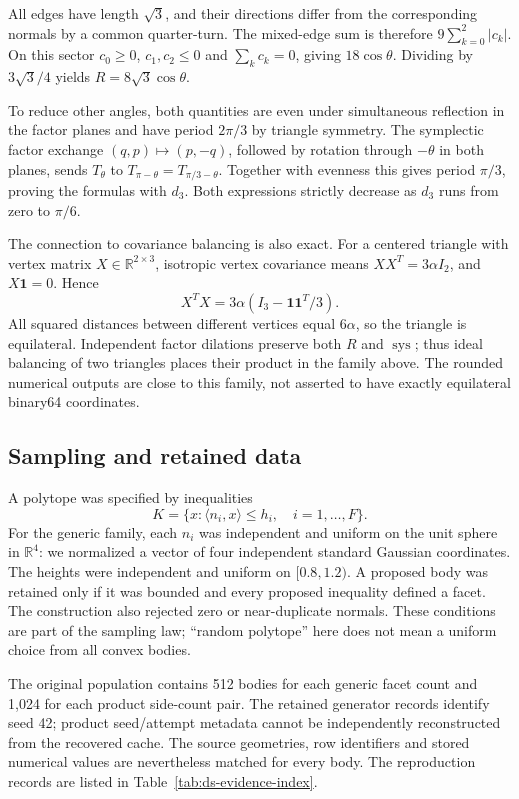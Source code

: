 All edges have length $\sqrt3$, and their directions differ from the
corresponding normals by a common quarter-turn. The mixed-edge sum is
therefore $9\sum_{k=0}^2|c_k|$. On this sector $c_0\geq0$,
$c_1,c_2\leq0$ and $\sum_k c_k=0$, giving $18\cos\theta$.
Dividing by $3\sqrt3/4$ yields $R=8\sqrt3\cos\theta$.

To reduce other angles, both quantities are even under simultaneous
reflection in the factor planes and have period $2\pi/3$ by triangle
symmetry. The symplectic factor exchange $(q,p)\mapsto(p,-q)$, followed
by rotation through $-\theta$ in both planes, sends $T_\theta$ to
$T_{\pi-\theta}=T_{\pi/3-\theta}$. Together with evenness this gives
period $\pi/3$, proving the formulas with $d_3$. Both expressions
strictly decrease as $d_3$ runs from zero to $\pi/6$.

The connection to covariance balancing is also exact. For a centered
triangle with vertex matrix $X\in\mathbb R^{2\times3}$, isotropic vertex
covariance means $XX^T=3\alpha I_2$, and $X\mathbf1=0$. Hence
\[
 X^TX=3\alpha(I_3-\mathbf1\mathbf1^T/3).
\]
All squared distances between different vertices equal $6\alpha$, so
the triangle is equilateral. Independent factor dilations preserve both
$R$ and $\operatorname{sys}$; thus ideal balancing of two triangles
places their product in the family above. The rounded numerical outputs
are close to this family, not asserted to have exactly equilateral
binary64 coordinates.

\subsection{Sampling and retained data}\label{app:ds-generation}

A polytope was specified by inequalities
\[
 K=\{x:\langle n_i,x\rangle\leq h_i,\quad i=1,\ldots,F\}.
\]
For the generic family, each $n_i$ was independent and uniform on the unit
sphere in $\mathbb R^4$: we normalized a vector of four independent standard
Gaussian coordinates. The heights were independent and uniform on
$[0.8,1.2)$. A proposed body was retained only if it was bounded and every
proposed inequality defined a facet. The construction also rejected zero or
near-duplicate normals. These conditions are part of the sampling law;
``random polytope'' here does not mean a uniform choice from all convex bodies.

The original population contains 512 bodies for each generic facet count
and 1,024 for each product side-count pair. The retained generator records
identify seed 42; product seed/attempt metadata cannot be independently
reconstructed from the recovered cache. The source geometries, row identifiers
and stored numerical values are nevertheless matched for every body.
The reproduction records are listed in Table~\ref{tab:ds-evidence-index}.

